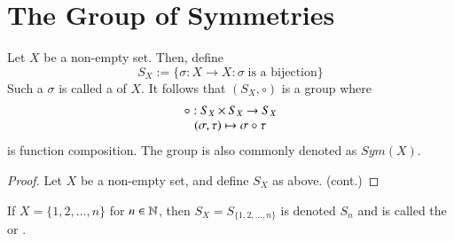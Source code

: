 \section{\textsection The Group of Symmetries}

\begin{defn}
    Let $X$ be a non-empty set. Then, define \begin{equation}
        S_X:=\{\sigma:X\rightarrow X:\sigma\;\text{is a bijection}\}
    \end{equation}
    Such a $\sigma$ is called a  of $X$. It follows that $(S_X, \circ)$ is a group where \begin{equation}
        \begin{array}{c} \circ:S_X\times S_X\rightarrow S_X \\ (\sigma,\tau)\mapsto \sigma \circ \tau \end{array}
    \end{equation}
    is function composition. The group is also commonly denoted as $Sym(X)$.
    \begin{proof}
        Let $X$ be a non-empty set, and define $S_X$ as above. (cont.)
    \end{proof}
\end{defn}

\begin{defn}
    If $X = \{1,2,...,n\}$ for $n \in \mathbb N$, then $S_X = S_{\{1,2,...,n\}}$ is denoted $S_n$ and is called the  or .
\end{defn}

